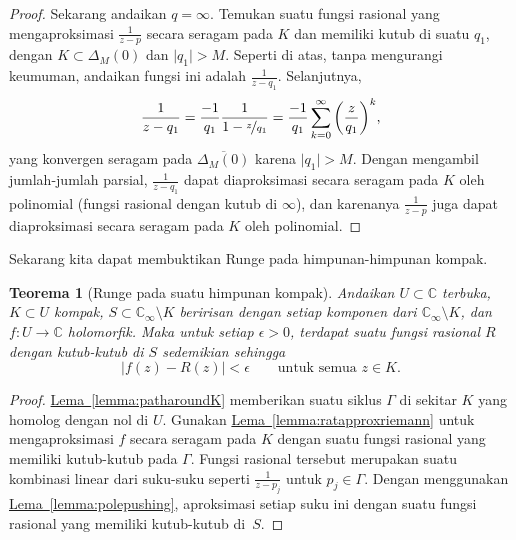 \documentclass[12pt,openany]{book}
\newcommand{\sabs}[1]{\lvert {#1} \rvert}
\newcommand{\abs}[1]{\left\lvert {#1} \right\rvert}
\newcommand{\C}{{\mathbb{C}}}
\theoremstyle{plain}
\newtheorem{thm}{Teorema}[section]
\theoremstyle{remark}
\theoremstyle{definition}
\theoremstyle{exercise}
\theoremstyle{example}
\newcommand{\lemmaref}[1]{\hyperref[#1]{Lema~\ref*{#1}}}
\begin{document}
\begin{proof}
Sekarang andaikan $q =\infty$. Temukan suatu fungsi rasional
yang mengaproksimasi $\frac{1}{z-p}$ secara seragam pada $K$ dan memiliki kutub
di suatu $q_1$, dengan
$K \subset \Delta_M(0)$ dan $\sabs{q_1} > M$.
Seperti di atas, tanpa mengurangi keumuman, andaikan fungsi ini
adalah $\frac{1}{z-q_1}$.
Selanjutnya,
\begin{equation*}
\frac{1}{z-q_1}
=
\frac{-1}{q_1}
\frac{1}{1-\nicefrac{z}{q_1}}
=
\frac{-1}{q_1}
\sum_{k=0}^\infty
{\left(\frac{z}{q_1}\right)}^k ,
\end{equation*}
yang konvergen seragam pada $\overline{\Delta_M(0)}$ karena $\sabs{q_1} > M$.
Dengan mengambil jumlah-jumlah parsial, $\frac{1}{z-q_1}$ dapat diaproksimasi
secara seragam pada $K$ oleh polinomial (fungsi rasional dengan kutub di
$\infty$),
dan karenanya $\frac{1}{z-p}$ juga dapat diaproksimasi secara seragam pada $K$ oleh polinomial.
\end{proof}

Sekarang kita dapat membuktikan Runge pada himpunan-himpunan kompak.

\begin{thm}[Runge pada suatu himpunan kompak]%
\label{thm:rungecpt}
Andaikan $U \subset \C$ terbuka, $K \subset U$ kompak, $S \subset \C_{\infty} \setminus K$
beririsan dengan setiap komponen dari $\C_\infty \setminus K$,
dan $f \colon U \to \C$ holomorfik.
Maka untuk setiap $\epsilon > 0$,
terdapat suatu fungsi rasional $R$ dengan kutub-kutub di $S$ sedemikian sehingga
\begin{equation*}
\abs{f(z)-R(z)} < \epsilon \qquad \text{untuk semua $z \in K$.}
\end{equation*}
\end{thm}

\begin{proof}
\lemmaref{lemma:patharoundK} memberikan suatu siklus $\Gamma$
di sekitar $K$ yang homolog
dengan nol di $U$.  Gunakan \lemmaref{lemma:ratapproxriemann} untuk mengaproksimasi
$f$ secara seragam pada $K$ dengan suatu fungsi rasional yang memiliki kutub-kutub pada $\Gamma$.
Fungsi rasional tersebut merupakan suatu kombinasi linear dari
suku-suku seperti $\frac{1}{z-p_j}$ untuk $p_j \in \Gamma$.
Dengan menggunakan \lemmaref{lemma:polepushing}, aproksimasi setiap suku ini
dengan suatu fungsi rasional yang memiliki kutub-kutub di~$S$.
\end{proof}
\end{document}
